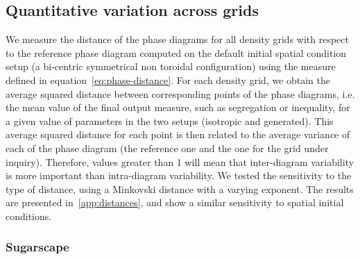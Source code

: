 \documentclass{JASSS}
\begin{document}
\subsection{Quantitative variation across grids}

We measure the distance of the phase diagrams for all density grids with respect to the reference phase diagram computed on the default initial spatial condition setup (a bi-centric symmetrical non toroidal configuration) using the measure defined in equation~\ref{eq:phase-distance}. For each density grid, we obtain the average squared distance between corresponding points of the phase diagrams, i.e. the mean value of the final output measure, such as segregation or inequality, for a given value of parameters in the two setups (isotropic and generated). This average squared distance for each point is then related to the average variance of each of the phase diagram (the reference one and the one for the grid under inquiry). Therefore, values greater than 1 will mean that inter-diagram variability is more important than intra-diagram variability. We tested the sensitivity to the type of distance, using a Minkovski distance with a varying exponent. The results are presented in~\ref{app:distances}, and show a similar sensitivity to spatial initial conditions.

\subsubsection{Sugarscape} 


\end{document}
